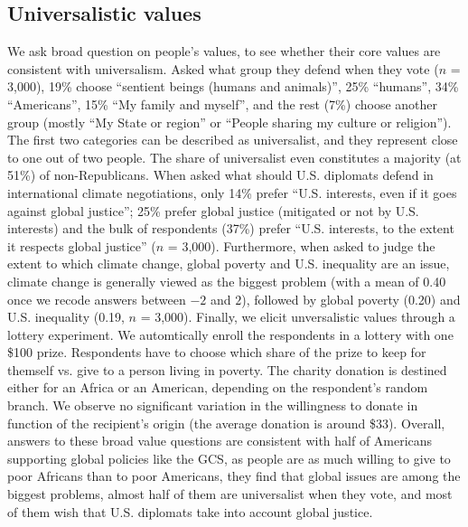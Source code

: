 \subsection{Universalistic values}
We ask broad question on people's values, to see whether their core values are consistent with universalism. Asked what group they defend when they vote ($n$ = 3,000), 19\% choose ``sentient beings (humans and animals)'', 25\% ``humans'', 34\% ``Americans'', 15\% ``My family and myself'', and the rest (7\%) choose another group (mostly ``My State or region'' or ``People sharing my culture or religion''). The first two categories can be described as universalist, and they represent close to one out of two people. The share of universalist even constitutes a majority (at 51\%) of non-Republicans. 
When asked what should U.S. diplomats defend in international climate negotiations, only 14\% prefer ``U.S. interests, even if it goes against global justice''; 25\% prefer global justice (mitigated or not by U.S. interests) and the bulk of respondents (37\%) prefer ``U.S. interests, to the extent it respects global justice'' ($n$ = 3,000). 
Furthermore, when asked to judge the extent to which climate change, global poverty and U.S. inequality are an issue, climate change is generally viewed as the biggest problem (with a mean of 0.40 once we recode answers between $-2$ and $2$), followed by global poverty (0.20) and U.S. inequality (0.19, $n$ = 3,000). 
Finally, we elicit unversalistic values through a lottery experiment. We automtically enroll the respondents in a lottery with one \$100 prize. Respondents have to choose which share of the prize to keep for themself vs. give to a person living in poverty. The charity donation is destined either for an Africa or an American, depending on the respondent's random branch. We observe no significant variation in the willingness to donate in function of the recipient's origin (the average donation is around \$33).
Overall, answers to these broad value questions are consistent with half of Americans supporting global policies like the GCS, as people are as much willing to give to poor Africans than to poor Americans, they find that global issues are among the biggest problems, almost half of them are universalist when they vote, and most of them wish that U.S. diplomats take into account global justice.


